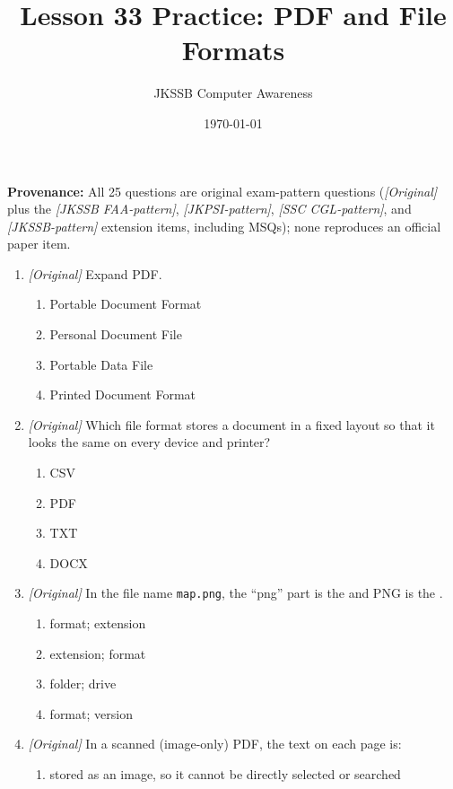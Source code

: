 \documentclass[11pt]{article}
\title{Lesson 33 Practice: PDF and File Formats}
\author{JKSSB Computer Awareness}
\date{\today}
\begin{document}
\maketitle
\noindent\textbf{Provenance:} All 25 questions are original exam-pattern questions (\textit{[Original]} plus the \textit{[JKSSB FAA-pattern]}, \textit{[JKPSI-pattern]}, \textit{[SSC CGL-pattern]}, and \textit{[JKSSB-pattern]} extension items, including MSQs); none reproduces an official paper item.

\begin{enumerate}[label=\textbf{Q\arabic*.}, leftmargin=*]
\item \textit{[Original]} Expand PDF.
  \begin{enumerate}[label=\Alph*.]
    \item Portable Document Format
    \item Personal Document File
    \item Portable Data File
    \item Printed Document Format
  \end{enumerate}
\item \textit{[Original]} Which file format stores a document in a fixed
  layout so that it looks the same on every device and printer?
  \begin{enumerate}[label=\Alph*.]
    \item CSV
    \item PDF
    \item TXT
    \item DOCX
  \end{enumerate}
\item \textit{[Original]} In the file name \texttt{map.png}, the ``png'' part
  is the \underline{\hspace{1.8cm}} and PNG is the \underline{\hspace{1.8cm}}.
  \begin{enumerate}[label=\Alph*.]
    \item format; extension
    \item extension; format
    \item folder; drive
    \item format; version
  \end{enumerate}
\item \textit{[Original]} In a scanned (image-only) PDF, the text on each
  page is:
  \begin{enumerate}[label=\Alph*.]
    \item stored as an image, so it cannot be directly selected or searched

\end{enumerate}
\end{enumerate}
\end{document}
